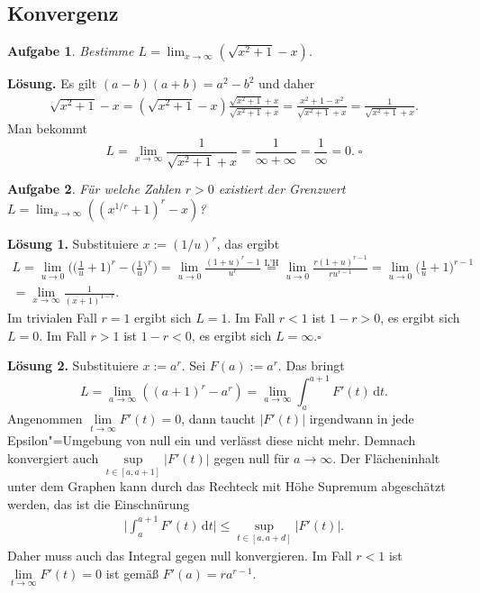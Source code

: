 \documentclass[a4paper,10pt,fleqn,twoside]{scrartcl}
\numberwithin{equation}{section}
\newcommand{\strong}[1]{{\normalfont\sffamily\bfseries #1}}
\renewcommand{\qedsymbol}{\ensuremath{\square}}
\theoremstyle{Aufgabe}
\newtheorem{Aufgabe}{\sffamily Aufgabe}[section]
\begin{document}
\subsection{Konvergenz}
\begin{Aufgabe}
Bestimme $L=\lim_{x\to\infty}(\sqrt{x^2+1}-x)$.
\end{Aufgabe}
\strong{Lösung.} Es gilt $(a-b)(a+b)=a^2-b^2$ und daher
\begin{gather*}
\sqrt{x^2+1}-x = (\sqrt{x^2+1}-x)\frac{\sqrt{x^2+1}+x}{\sqrt{x^2+1}+x}
= \frac{x^2+1-x^2}{\sqrt{x^2+1}+x} = \frac{1}{\sqrt{x^2+1}+x}.
\end{gather*}
Man bekommt
\[L = \lim_{x\to\infty} \frac{1}{\sqrt{x^2+1}+x}
= \frac{1}{\infty+\infty} = \frac{1}{\infty} = 0.\;\qedsymbol\]

\begin{Aufgabe}
Für welche Zahlen $r>0$ existiert der Grenzwert\\
$L=\lim_{x\to\infty}((x^{1/r}+1)^r-x)$?
\end{Aufgabe}
\strong{Lösung 1.} Substituiere $x:=(1/u)^r$, das ergibt
\begin{gather*}
L = \lim_{u\to 0} \bigg(\bigg(\frac{1}{u}+1\bigg)^r-\bigg(\frac{1}{u}\bigg)^r\bigg)
= \lim_{u\to 0} \frac{(1+u)^r-1}{u^r}
\stackrel{\text{L'H}}= \lim_{u\to 0} \frac{r(1+u)^{r-1}}{ru^{r-1}}
= \lim_{u\to 0} \bigg(\frac{1}{u}+1\bigg)^{r-1}\\
= \lim_{x\to\infty}\frac{1}{(x+1)^{1-r}}.
\end{gather*}
Im trivialen Fall $r=1$ ergibt sich $L=1$. Im Fall $r<1$ ist
$1-r>0$, es ergibt sich $L=0$. Im Fall $r>1$ ist $1-r<0$,
es ergibt sich $L=\infty$.\;\qedsymbol

\strong{Lösung 2.} Substituiere $x:=a^r$. Sei $F(a):=a^r$.
Das bringt
\[L = \lim_{a\to\infty} ((a+1)^r-a^r)
= \lim_{a\to\infty} \int_a^{a+1} F'(t)\,\mathrm dt.\]
Angenommen $\lim\limits_{t\to\infty}F'(t)=0$, dann taucht $|F'(t)|$
irgendwann in jede Epsilon"=Umgebung von null ein und verlässt
diese nicht mehr. Demnach konvergiert auch
$\sup\limits_{t\in [a,a+1]}|F'(t)|$ gegen null für $a\to\infty$.
Der Flächeninhalt unter dem Graphen kann durch das Rechteck mit
Höhe Supremum abgeschätzt werden, das ist die Einschnürung%
\begin{gather*}
\bigg|\int_a^{a+1} F'(t)\,\mathrm dt\bigg| \le \sup_{t\in [a,a+d]} |F'(t)|.
\end{gather*}
Daher muss auch das Integral gegen null konvergieren.
Im Fall $r<1$ ist $\lim\limits_{t\to\infty}F'(t)=0$ ist gemäß $F'(a)=ra^{r-1}$.
\end{document}
